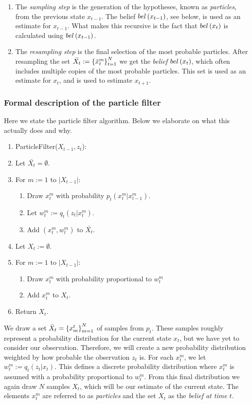\begin{enumerate}
\item The \emph{sampling step} is the generation of the hypotheses, known as \emph{particles}, from the previous state $x_{t-1}$. The belief $bel\left(x_{t-1}\right)$, see below, is used as an estimate for $x_{t-1}$. What makes this recursive is the fact that $bel\left(x_t\right)$ is calculated using $bel\left(x_{t-1}\right)$.

\item The \emph{resampling step} is the final selection of the most probable particles. After resampling the set $\bar{X_t} := \left\{\bar{x}_{t}^{m}\right\}_{t=1}^{N}$ we get the \emph{belief} $bel\left(x_t\right)$, which often includes multiple copies of the most probable particles. This set is used as an estimate for $x_t$, and is used to estimate $x_{t+1}$.
\end{enumerate}


\subsubsection{Formal description of the particle filter}
Here we state the particle filter algorithm. Below we elaborate on what this actually does and why.
\begin{enumerate}
\item ParticleFilter($X_{t-1}, z_t$):
\item Let $\bar{X_t} = \emptyset$.
\item For $m:=1$ to $\left|X_{t-1}\right|$:
  \begin{enumerate}
  \item Draw $x_t^m$ with probability $p_t\left(x_t^m | x_{t-1}^m\right)$.
  \item Let $w_t^m := q_t\left(z_t | x_t^m\right)$.
  \item Add $(x_t^m, w_t^m)$ to $\bar{X_t}$.
  \end{enumerate}
\item Let $X_t := \emptyset$.
\item For $m:=1$ to $\left|X_{t-1}\right|$:
  \begin{enumerate}
    \item Draw $x_t^m$ with probability proportional to $w_t^m$
    \item Add $x_t^m$ to $X_t$.
  \end{enumerate}
\item Return $X_t$.
\end{enumerate}


We draw a set $\bar{X}_t = \left\{x_{m}^{t}\right\}_{m=1}^{N}$ of samples from $p_t$. These samples roughly represent a probability distribution for the current state $x_t$, but we have yet to consider our observation. Therefore, we will create a new probability distribution weighted by how probable the observation $z_t$ is. For each $x_t^m$, we let $w_t^m := q_t\left(z_t | x_t\right)$. This defines a discrete probability distribution where $x_t^m$ is assumed with a probability proportional to $w_t^m$. From this final distribution we again draw $N$ samples $X_t$, which will be our estimate of the current state. The elements $x_t^m$ are referred to as \emph{particles} and the set $X_t$ as the \emph{belief at time $t$}.

